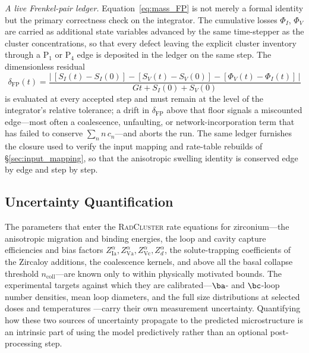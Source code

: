 \emph{A live Frenkel-pair ledger.} Equation~\eqref{eq:mass_FP} is not merely a
formal identity but the primary correctness check on the integrator. The
cumulative losses $\Phi_I$, $\Phi_V$ are carried as additional state variables
advanced by the same time-stepper as the cluster concentrations, so that every
defect leaving the explicit cluster inventory through a $\mathrm{P}_1$ or
$\mathrm{P}_4$ edge is deposited in the ledger on the same step. The
dimensionless residual
\begin{equation}\label{eq:FP_residual}
  \delta_{\mathrm{FP}}(t)=\frac{\bigl|\,[S_I(t)-S_I(0)]-[S_V(t)-S_V(0)]
        -[\Phi_V(t)-\Phi_I(t)]\,\bigr|}{Gt+S_I(0)+S_V(0)}
\end{equation}
is evaluated at every accepted step and must remain at the level of the
integrator's relative tolerance; a drift in $\delta_{\mathrm{FP}}$ above that
floor signals a miscounted edge---most often a coalescence, unfaulting, or
network-incorporation term that has failed to conserve $\sum_n n\,c_n$---and
aborts the run. The same ledger furnishes the closure used to verify the
input mapping and rate-table rebuilds of \S\ref{sec:input_mapping}, so that the
anisotropic swelling identity is conserved edge by edge and step by step.




\subsection{Uncertainty Quantification}
\label{sec:uq}
The parameters that enter the \textsc{RadCluster} rate equations for
zirconium---the anisotropic migration and binding energies, the loop and
cavity capture efficiencies and bias factors
$Z^{\alpha}_{\mathrm{Ia}},Z^{\alpha}_{\mathrm{Va}},
Z^{\alpha}_{\mathrm{Vc}},Z^{\alpha}_{d}$, the solute-trapping coefficients
of the Zircaloy additions, the coalescence kernels, and above all the
basal collapse threshold $n_{\mathrm{coll}}$---are known only to within
physically motivated bounds. The experimental targets against which they
are calibrated---$\ba$- and $\bc$-loop number densities, mean loop
diameters, and the full size distributions at selected doses and
temperatures \citep{Holt1988,HoltCausey1993,Doriot2015}---carry their own
measurement uncertainty. Quantifying how these two sources of uncertainty
propagate to the predicted microstructure is an intrinsic part of using
the model predictively rather than an optional post-processing step.


